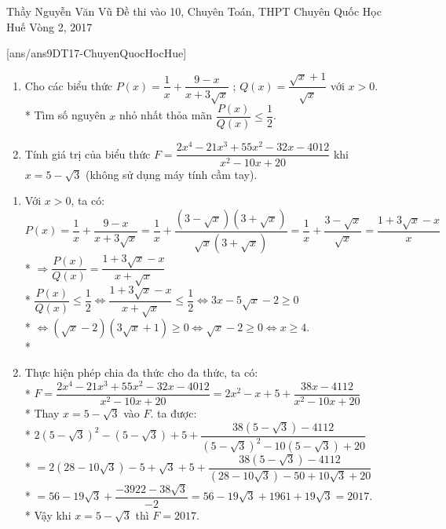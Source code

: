 \begin{name}
{Thầy  Nguyễn Văn Vũ}
{Đề thi vào 10, Chuyên Toán, THPT Chuyên Quốc Học Huế Vòng 2, 2017}
\end{name}
\setcounter{ex}{0}
[ans/ans9DT17-ChuyenQuocHocHue]
\begin{ex}%
    \hfill
    \begin{enumerate}
        \item Cho các biểu thức $P(x)=\dfrac{1}{x}+\dfrac{9-x}{x
        +3\sqrt{x}}$ ; $Q(x)=\dfrac{\sqrt{x}+1}{\sqrt{x}}$ với $x>0$.\\*
        Tìm số nguyên $x$ nhỏ nhất thỏa mãn $\dfrac{P(x)}{Q(x)}\leq \dfrac{1}{2}$.
        \item Tính giá trị của biểu thức $F=\dfrac{2x^{4}-21x^{3}+55x^{2}-32x-4012}{x^{2}-10x+20}$ khi $x=5-\sqrt{3}$ (không sử dụng máy tính cầm tay).
    \end{enumerate}
\loigiai
    {
    \begin{enumerate}
        \item Với $x>0$, ta có:\\
        $P(x)=\dfrac{1}{x}+\dfrac{9-x}{x+3\sqrt{x}}=\dfrac{1}{x}+\dfrac{(3-\sqrt{x})(3+\sqrt{x})}{\sqrt{x}(3+\sqrt{x})}=\dfrac{1}{x}+\dfrac{3-\sqrt{x}}{\sqrt{x}}=\dfrac{1+3\sqrt{x}-x}{x}$\\*
        $\Rightarrow \dfrac{P(x)}{Q(x)}=\dfrac{1+3\sqrt{x}-x}{x+\sqrt{x}}$\\*
        $\dfrac{P(x)}{Q(x)}\leq \dfrac{1}{2}\Leftrightarrow \dfrac{1+3\sqrt{x}-x}{x+\sqrt{x}} \leq \dfrac{1}{2} \Leftrightarrow 3x-5\sqrt{x}-2 \geq 0$\\*
        $\Leftrightarrow \left(\sqrt{x}-2\right)\left(3\sqrt{x}+1\right)\geq 0 \Leftrightarrow \sqrt{x}-2\geq 0 \Leftrightarrow x\geq 4$.\\*
        \item Thực hiện phép chia đa thức cho đa thức, ta có:\\*
        $F = \dfrac{{2{x^4} - 21{x^3} + 55{x^2} - 32x - 4012}}{{{x^2} - 10x + 20}} = 2{x^2} - x + 5 + \dfrac{{38x - 4112}}{{{x^2} - 10x + 20}}$\\*
        Thay $x=5-\sqrt{3}$ vào $F$. ta được:\\*
        $2{\left( {5 - \sqrt 3 } \right)^2} - \left( {5 - \sqrt 3 } \right) + 5 + \dfrac{{38\left( {5 - \sqrt 3 } \right) - 4112}}{{{{\left( {5 - \sqrt 3 } \right)}^2} - 10\left( {5 - \sqrt 3 } \right) + 20}}$\\*
        $ = 2\left( {28 - 10\sqrt 3 } \right) - 5 + \sqrt 3  + 5 + \dfrac{{38\left( {5 - \sqrt 3 } \right) - 4112}}{{\left( {28 - 10\sqrt 3 } \right) - 50 + 10\sqrt 3  + 20}}$\\*
        $ = 56 - 19\sqrt 3  + \dfrac{{ - 3922 - 38\sqrt 3 }}{{ - 2}} = 56 - 19\sqrt 3  + 1961 + 19\sqrt 3  = 2017$.\\*
        Vậy khi $x=5-\sqrt{3}$ thì $F=2017.$
    \end{enumerate}
    }
\end{ex}

